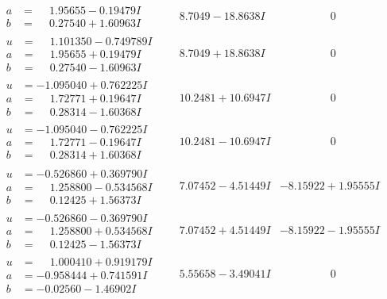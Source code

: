 \documentclass[1p]{elsarticle_modified}
\theoremstyle{definition}
\begin{document}
$$\begin{array}{c|c|c}
\begin{aligned}
a &= \phantom{-}1.95655 - 0.19479 I \\
b &= \phantom{-}0.27540 + 1.60963 I\end{aligned}
 & \phantom{-}8.7049 - 18.8638 I & \phantom{-0.000000 } 0 \\ \hline\begin{aligned}
u &= \phantom{-}1.101350 - 0.749789 I \\
a &= \phantom{-}1.95655 + 0.19479 I \\
b &= \phantom{-}0.27540 - 1.60963 I\end{aligned}
 & \phantom{-}8.7049 + 18.8638 I & \phantom{-0.000000 } 0 \\ \hline\begin{aligned}
u &= -1.095040 + 0.762225 I \\
a &= \phantom{-}1.72771 + 0.19647 I \\
b &= \phantom{-}0.28314 - 1.60368 I\end{aligned}
 & \phantom{-}10.2481 + 10.6947 I & \phantom{-0.000000 } 0 \\ \hline\begin{aligned}
u &= -1.095040 - 0.762225 I \\
a &= \phantom{-}1.72771 - 0.19647 I \\
b &= \phantom{-}0.28314 + 1.60368 I\end{aligned}
 & \phantom{-}10.2481 - 10.6947 I & \phantom{-0.000000 } 0 \\ \hline\begin{aligned}
u &= -0.526860 + 0.369790 I \\
a &= \phantom{-}1.258800 - 0.534568 I \\
b &= \phantom{-}0.12425 + 1.56373 I\end{aligned}
 & \phantom{-}7.07452 - 4.51449 I & -8.15922 + 1.95555 I \\ \hline\begin{aligned}
u &= -0.526860 - 0.369790 I \\
a &= \phantom{-}1.258800 + 0.534568 I \\
b &= \phantom{-}0.12425 - 1.56373 I\end{aligned}
 & \phantom{-}7.07452 + 4.51449 I & -8.15922 - 1.95555 I \\ \hline\begin{aligned}
u &= \phantom{-}1.000410 + 0.919179 I \\
a &= -0.958444 + 0.741591 I \\
b &= -0.02560 - 1.46902 I\end{aligned}
 & \phantom{-}5.55658 - 3.49041 I & \phantom{-0.000000 } 0 \\ \hline\begin{aligned}

\end{aligned}
\end{array}$$
\end{document}
